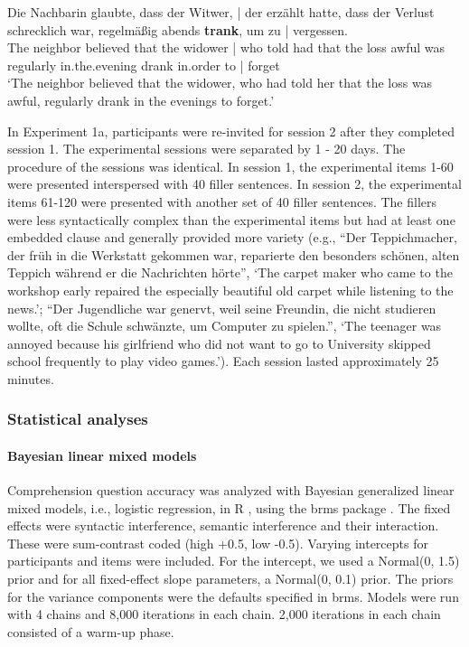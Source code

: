 \documentclass[review,preprint,12pt,authoryear,floatsintext]{elsarticle}
\begin{document}
\begin{exe}  
\ex \label{ex:linebreak}
    \gll Die Nachbarin glaubte, dass der Witwer, | der erzählt hatte, dass der Verlust schrecklich war, regelmäßig abends \textbf{trank}, um zu | vergessen. \\ 
    The neighbor believed that the widower | who told had that the loss awful was regularly in.the.evening drank in.order to | forget\\
    \trans  `The neighbor believed that the widower, who had told her that the loss was awful, regularly drank in the evenings to forget.'\\  
\end{exe}

{In Experiment 1a, participants were re-invited for session 2 after they completed session 1. The experimental sessions were separated by 1 - 20 days. The procedure of the sessions was identical. In session 1, the experimental items 1-60 were presented interspersed with 40 filler sentences. In session 2, the experimental items 61-120 were presented with another set of 40 filler sentences. The fillers were less syntactically complex than the experimental items but had at least one embedded clause and generally provided more variety (e.g., ``Der Teppichmacher, der früh in die Werkstatt gekommen war, reparierte den besonders schönen, alten Teppich während er die Nachrichten hörte'', `The carpet maker who came to the workshop early repaired the especially beautiful old carpet while listening to the news.'; ``Der Jugendliche war genervt, weil seine Freundin, die nicht studieren wollte, oft die Schule schwänzte, um Computer zu spielen.'', `The teenager was annoyed because his girlfriend who did not want to go to University  skipped school frequently to play video games.').}\label{fillers1} Each session lasted approximately 25 minutes.

\subsubsection{Statistical analyses}

\paragraph{Bayesian linear mixed models}
Comprehension question accuracy was analyzed with Bayesian generalized linear mixed models, i.e., logistic regression, in R \citep{r}, using the brms package \citep{brms}. The fixed effects were syntactic interference, semantic interference and their interaction. These were sum-contrast coded (high +0.5, low -0.5). Varying intercepts for participants and items were included. For the intercept, we used a Normal(0, 1.5) prior and  for all fixed-effect slope parameters, a Normal(0, 0.1) prior. The priors for the variance components were the defaults specified in brms. Models were run with 4 chains and 8,000 iterations in each chain. 2,000 iterations in each chain consisted of a warm-up phase. 
\end{document}
